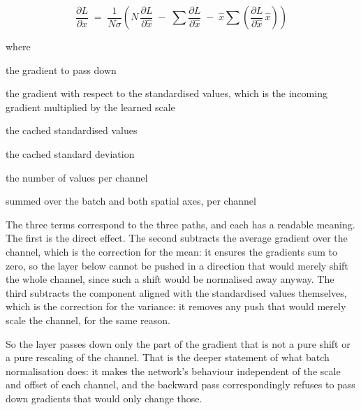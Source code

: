 \begin{equation}
\frac{\partial L}{\partial x} \;=\; \frac{1}{N\sigma}\left( N \, \frac{\partial L}{\partial \hat{x}} \;-\; \sum \frac{\partial L}{\partial \hat{x}} \;-\; \hat{x} \sum \left( \frac{\partial L}{\partial \hat{x}} \, \hat{x} \right) \right)
\end{equation}

\noindent where
\begin{description}[leftmargin=2.4em,style=nextline,font=\normalfont\ttfamily]\setlength\itemsep{1pt}
  \item[{$\frac{\partial L}{\partial x}$}] \normalfont the gradient to pass down
  \item[{$\frac{\partial L}{\partial \hat{x}}$}] \normalfont the gradient with respect to the standardised values, which is the incoming gradient multiplied by the learned scale
  \item[{$\hat{x}$}] \normalfont the cached standardised values
  \item[{$\sigma$}] \normalfont the cached standard deviation
  \item[{$N$}] \normalfont the number of values per channel
  \item[{$\sum$}] \normalfont summed over the batch and both spatial axes, per channel
\end{description}
The three terms correspond to the three paths, and each has a readable meaning. The first is the direct effect. The second subtracts the average gradient over the channel, which is the correction for the mean: it ensures the gradients sum to zero, so the layer below cannot be pushed in a direction that would merely shift the whole channel, since such a shift would be normalised away anyway. The third subtracts the component aligned with the standardised values themselves, which is the correction for the variance: it removes any push that would merely scale the channel, for the same reason.

So the layer passes down only the part of the gradient that is not a pure shift or a pure rescaling of the channel. That is the deeper statement of what batch normalisation does: it makes the network's behaviour independent of the scale and offset of each channel, and the backward pass correspondingly refuses to pass down gradients that would only change those.



